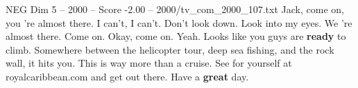 \begin{textsample}{NEG Dim 5 – 2000 – Score -2.00 – 2000/tv\_com\_2000\_107.txt}  \label{ex:f5_neg_035}
Jack, come on, you 're almost there.
I can't, I can't.
Don't look down.
Look into my eyes.
We 're almost there.
Come on.
Okay, come on.
Yeah.
Looks like you guys are \textbf{ready} to climb.
Somewhere between the helicopter tour, deep sea fishing, and the rock wall, it hits you.
This is way more than a cruise.
See for yourself at royalcaribbean.com and get out there.
Have a \textbf{great} day.

\end{textsample}
